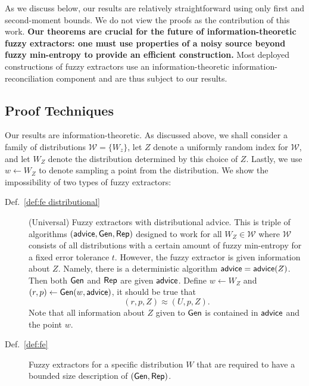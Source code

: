 As we discuss below, our results are relatively straightforward using only first and second-moment bounds.  We do not view the proofs as the contribution of this work.  \textbf{Our theorems are crucial for the future of information-theoretic fuzzy extractors: one must use properties of a noisy source beyond fuzzy min-entropy to provide an efficient construction.}  Most deployed constructions of fuzzy extractors use an information-theoretic information-reconciliation component and are thus subject to our results. 




\subsection{Proof Techniques}
Our results are information-theoretic. As discussed above, we shall
consider a family of distributions $\mathcal{W} = \{ W_z \}$, let $Z$
denote a uniformly random index for $\mathcal{W}$, and let $W_Z$
denote the distribution determined by this choice of $Z$.
Lastly, we use $w\leftarrow W_Z$ to
denote sampling a point from the distribution.  We show the
impossibility of two types of fuzzy extractors:
\begin{description}
\item[Def.~\ref{def:fe distributional}] (Universal) Fuzzy extractors with distributional advice.  This is triple of algorithms $({\mathsf{advice}}, {\mathsf{Gen}}, {\mathsf{Rep}})$ designed to work for all $W_Z \in \mathcal{W}$ where $\mathcal{W}$ consists of all distributions with a certain amount of fuzzy min-entropy for a fixed error tolerance $t$.  However, the fuzzy extractor is given information about $Z$.  Namely, there is a deterministic algorithm ${\mathsf{advice}} = {\mathsf{advice}}(Z)$. Then both ${\mathsf{Gen}}$ and ${\mathsf{Rep}}$ are given ${\mathsf{advice}}$. Define $w\leftarrow W_Z$ and $(r, p) \leftarrow {\ensuremath{\mathsf{Gen}}}(w, {\mathsf{advice}})$, it should be true that 
\[
(r, p, Z) \approx (U, p, Z).
\]
Note that all information about $Z$ given to ${\mathsf{Gen}}$ is contained in ${\mathsf{advice}}$ and the point $w$.
\item[Def.~\ref{def:fe}] Fuzzy extractors for a specific distribution $W$ that are required to have a bounded size description of $({\mathsf{Gen}}, {\mathsf{Rep}})$.
\end{description}

